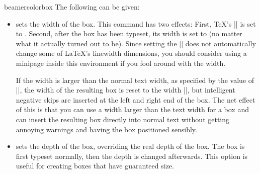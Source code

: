 \begin{environment}{{beamercolorbox}}
  The following  can be given:
  \begin{itemize}
  \item
     sets the width of the box. This command has two effects: First, \TeX's |\hsize| is set to . Second, after the box has been typeset, its width is set to  (no matter what it actually turned out to be). Since setting the |\hsize| does not automatically change some of \LaTeX's linewidth dimensions, you should consider using a minipage inside this environment if you fool around with the width.

    If the width is larger than the normal text width, as specified by the value of |\textwidth|, the width of the resulting box is reset to the width |\textwidth|, but intelligent negative skips are inserted at the left and right end of the box. The net effect of this is that you can use a width larger than the text width for a box and can insert the resulting box directly into normal text without getting annoying warnings and having the box positioned sensibly.
  \item
     sets the depth of the box, overriding the real depth of the box. The box is first typeset normally, then the depth is changed afterwards. This option is useful for creating boxes that have guaranteed size.


\end{itemize}
\end{environment}
